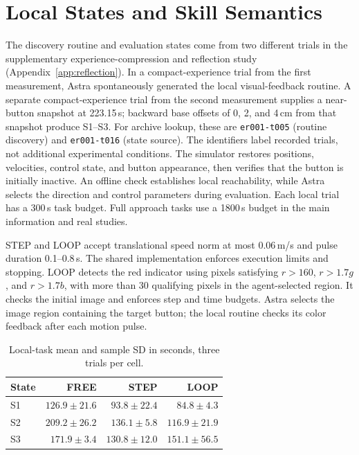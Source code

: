 \documentclass[11pt]{article}
\begin{document}
\section{Local States and Skill Semantics}\label{app:skill-diagnostics}
The discovery routine and evaluation states come from two different trials in the supplementary experience-compression and reflection study (Appendix~\ref{app:reflection}). In a compact-experience trial from the first measurement, Astra spontaneously generated the local visual-feedback routine. A separate compact-experience trial from the second measurement supplies a near-button snapshot at 223.15\,s; backward base offsets of 0, 2, and 4\,cm from that snapshot produce S1--S3. For archive lookup, these are \texttt{er001-t005} (routine discovery) and \texttt{er001-t016} (state source). The identifiers label recorded trials, not additional experimental conditions. The simulator restores positions, velocities, control state, and button appearance, then verifies that the button is initially inactive. An offline check establishes local reachability, while Astra selects the direction and control parameters during evaluation. Each local trial has a 300\,s task budget. Full approach tasks use a 1800\,s budget in the main information and real studies.

STEP and LOOP accept translational speed norm at most 0.06\,m/s and pulse duration 0.1--0.8\,s. The shared implementation enforces execution limits and stopping. LOOP detects the red indicator using pixels satisfying $r>160$, $r>1.7g$, and $r>1.7b$, with more than 30 qualifying pixels in the agent-selected region. It checks the initial image and enforces step and time budgets. Astra selects the image region containing the target button; the local routine checks its color feedback after each motion pulse.

\begin{table}[H]\centering
\begin{tabular}{lrrr}\toprule
State & FREE & STEP & LOOP\\\midrule
S1 & $126.9\pm21.6$ & $93.8\pm22.4$ & $84.8\pm4.3$\\
S2 & $209.2\pm26.2$ & $136.1\pm5.8$ & $116.9\pm21.9$\\
S3 & $171.9\pm3.4$ & $130.8\pm12.0$ & $151.1\pm56.5$\\\bottomrule
\end{tabular}
\caption{Local-task mean and sample SD in seconds, three trials per cell.}\label{tab:local-states}
\end{table}
\end{document}
